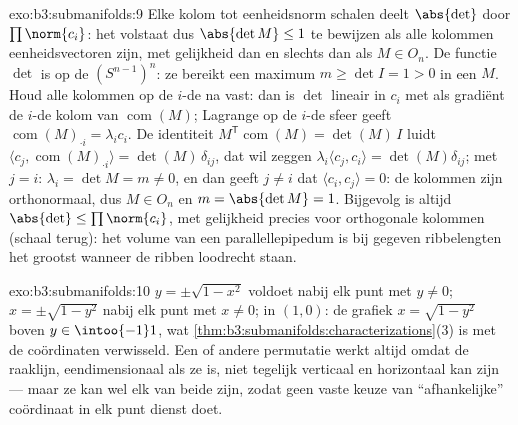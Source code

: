 \begin{solution}{exo:b3:submanifolds:9}
Elke kolom tot eenheidsnorm schalen deelt $\abs{\det}$ door
$\prod\norm{c_i}$: het volstaat dus $\abs{\det M} \leq 1$ te
bewijzen als alle kolommen eenheidsvectoren zijn, met gelijkheid
dan en slechts dan als $M \in O_n$. De functie $\det$ is 
op de  $(S^{n-1})^n$: ze bereikt een maximum $m \geq \det
I = 1 > 0$ in een $M$. Houd alle kolommen op de $i$-de na vast:
dan is $\det$ lineair in $c_i$ met als gradiënt de $i$-de kolom
van $\operatorname{com}(M)$; Lagrange op de $i$-de sfeer geeft
$\operatorname{com}(M)_{\cdot i} = \lambda_i c_i$. De identiteit
$M^{\mathsf T}\operatorname{com}(M) = \det(M)\,I$ luidt $\langle
c_j, \operatorname{com}(M)_{\cdot i}\rangle = \det(M)\,
\delta_{ij}$, dat wil zeggen $\lambda_i\langle c_j, c_i\rangle =
\det(M)\delta_{ij}$; met $j = i$: $\lambda_i = \det M = m \neq
0$, en dan geeft $j \neq i$ dat $\langle c_i, c_j\rangle = 0$: de
kolommen zijn orthonormaal, dus $M \in O_n$ en $m = \abs{\det M}
= 1$. Bijgevolg is altijd $\abs{\det} \leq \prod\norm{c_i}$, met
gelijkheid precies voor orthogonale kolommen (schaal terug): het
volume van een parallellepipedum is bij gegeven ribbelengten het
grootst wanneer de ribben loodrecht staan.
\end{solution}

\begin{solution}{exo:b3:submanifolds:10}
$y = \pm\sqrt{1 - x^2}$ voldoet nabij elk punt met $y \neq 0$; $x
= \pm\sqrt{1 - y^2}$ nabij elk punt met $x \neq 0$; in $(1, 0)$:
de grafiek $x = \sqrt{1 - y^2}$ boven $y \in \intoo{-1}1$, wat
\cref{thm:b3:submanifolds:characterizations}(3) is met de
coördinaten verwisseld. Een of andere permutatie werkt altijd
omdat de raaklijn, eendimensionaal als ze is, niet tegelijk
verticaal en horizontaal kan zijn --- maar ze kan wel elk van
beide zijn, zodat geen vaste keuze van ``afhankelijke''
coördinaat in elk punt dienst doet.
\end{solution}

